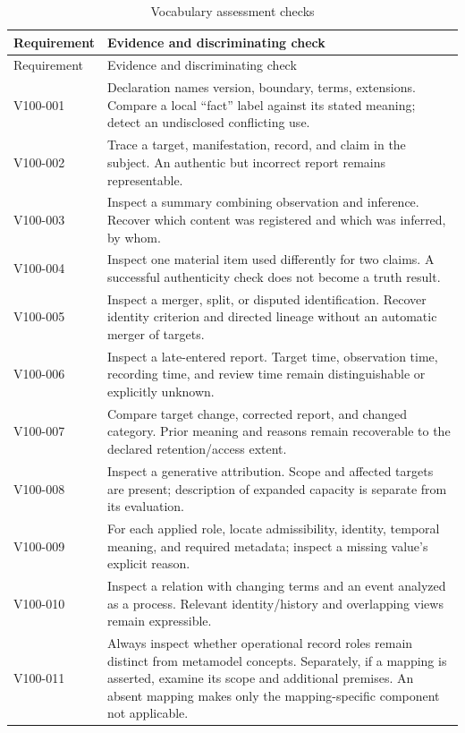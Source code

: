 \documentclass[11pt,a4paper]{article}
\begin{document}
\begin{longtable}{@{}L{0.17\textwidth}L{0.73\textwidth}@{}}
\caption{Vocabulary assessment checks}\label{tab:gr100-a}\\
\toprule
Requirement & Evidence and discriminating check \\
\midrule\endfirsthead
\toprule
Requirement & Evidence and discriminating check \\
\midrule\endhead
V100-001 & Declaration names version, boundary, terms, extensions. Compare a local ``fact'' label against its stated meaning; detect an undisclosed conflicting use. \\
V100-002 & Trace a target, manifestation, record, and claim in the subject. An authentic but incorrect report remains representable. \\
V100-003 & Inspect a summary combining observation and inference. Recover which content was registered and which was inferred, by whom. \\
V100-004 & Inspect one material item used differently for two claims. A successful authenticity check does not become a truth result. \\
V100-005 & Inspect a merger, split, or disputed identification. Recover identity criterion and directed lineage without an automatic merger of targets. \\
V100-006 & Inspect a late-entered report. Target time, observation time, recording time, and review time remain distinguishable or explicitly unknown. \\
V100-007 & Compare target change, corrected report, and changed category. Prior meaning and reasons remain recoverable to the declared retention/access extent. \\
V100-008 & Inspect a generative attribution. Scope and affected targets are present; description of expanded capacity is separate from its evaluation. \\
V100-009 & For each applied role, locate admissibility, identity, temporal meaning, and required metadata; inspect a missing value's explicit reason. \\
V100-010 & Inspect a relation with changing terms and an event analyzed as a process. Relevant identity/history and overlapping views remain expressible. \\
V100-011 & Always inspect whether operational record roles remain distinct from metamodel concepts. Separately, if a mapping is asserted, examine its scope and additional premises. An absent mapping makes only the mapping-specific component not applicable. \\

\end{longtable}
\end{document}
